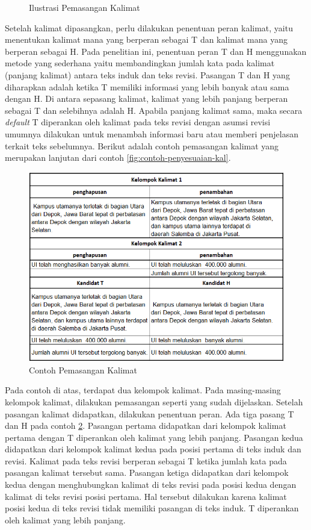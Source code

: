 \begin{enumerate}
\begin{figure}
		\caption{Ilustrasi Pemasangan Kalimat}
		\label{fig:sen_pair}
	\end{figure}
	Setelah kalimat dipasangkan, perlu dilakukan penentuan peran kalimat, yaitu menentukan kalimat mana yang berperan sebagai T dan kalimat mana yang berperan sebagai H. Pada penelitian ini, penentuan peran T dan H menggunakan metode yang sederhana yaitu membandingkan jumlah kata pada kalimat (panjang kalimat) antara teks induk dan teks revisi. Pasangan T dan H yang diharapkan adalah ketika T memiliki informasi yang lebih banyak atau sama dengan H. Di antara sepasang kalimat, kalimat yang lebih panjang berperan sebagai T dan selebihnya adalah H. Apabila panjang kalimat sama, maka secara \textit{default} T diperankan oleh kalimat pada teks revisi dengan asumsi revisi umumnya dilakukan untuk menambah informasi baru atau memberi penjelasan terkait teks sebelumnya. Berikut adalah contoh pemasangan kalimat yang merupakan lanjutan dari contoh \ref{fig:contoh-penyesuaian-kal}.
	\begin{figure}
		\centering
		\includegraphics[width=0.85\linewidth]{pics/contoh-pemasangan-kal}
		\caption{Contoh Pemasangan Kalimat}
		\label{fig:contoh-pemasangan-kal}
	\end{figure}
	Pada contoh di atas, terdapat dua kelompok kalimat. Pada masing-masing kelompok kalimat, dilakukan pemasangan seperti yang sudah dijelaskan. Setelah pasangan kalimat didapatkan, dilakukan penentuan peran. Ada tiga pasang T dan H pada contoh \ref{fig:contoh-pemasangan-kal}. Pasangan pertama didapatkan dari kelompok kalimat pertama dengan T diperankan oleh kalimat yang lebih panjang. Pasangan kedua didapatkan dari kelompok kalimat kedua pada posisi pertama di teks induk dan revisi. Kalimat pada teks revisi berperan sebagai T ketika jumlah kata pada pasangan kalimat tersebut sama. Pasangan ketiga didapatkan dari kelompok kedua dengan menghubungkan kalimat di teks revisi pada posisi kedua dengan kalimat di teks revisi posisi pertama. Hal tersebut dilakukan karena kalimat posisi kedua di teks revisi tidak memiliki pasangan di teks induk. T diperankan oleh kalimat yang lebih panjang.
\end{enumerate}


